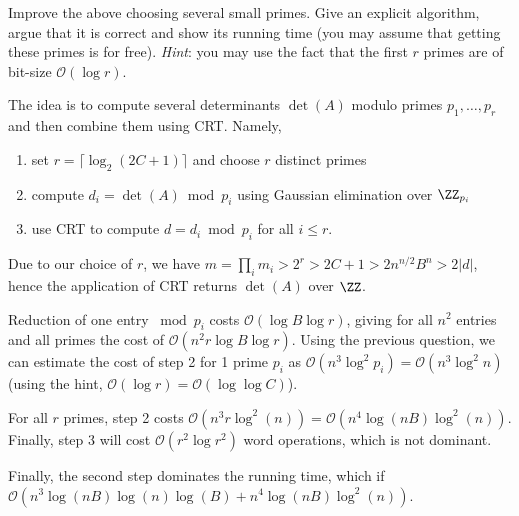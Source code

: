 \documentclass[11pt]{exam}
\theoremstyle{definition}
\begin{document}
\begin{questions}
	\question Improve the above choosing several small primes. Give an explicit algorithm, argue that it is correct and show its running time (you may assume that getting these primes is for free). \emph{Hint}: you may use the fact that the first $r$ primes are of bit-size $\mathcal{O}(\log r)$.
	\begin{solution}
		The idea is to compute several determinants $\det(A)$ modulo primes $p_1, \ldots, p_r$ and then combine them using CRT. Namely,
		\begin{enumerate}
			\item set $r = \lceil \log_2(2C+1) \rceil$ and choose $r$ distinct primes
			\item compute $d_i = \det(A) \bmod p_i$ using Gaussian elimination over $\ZZ_{p_i}$
			\item use CRT to compute $d = d_i \bmod p_i$ for all $i \leq r$.
		\end{enumerate}
		 
		 Due to our choice of $r$, we have $m = \prod_i m_i > 2^r > 2C+1 > 2 n^{n/2}B^n > 2|d|$, hence the application of CRT returns $\det(A)$ over $\ZZ$.
		 
		 
		 Reduction of one entry $\bmod p_i$ costs $\mathcal{O}(\log B \log r)$, giving for all $n^2$ entries and all primes the cost of $\mathcal{O}(n^2 r \log B \log r)$.
		 Using the previous question, we can estimate the cost of step 2 for 1 prime $p_i$ as $\mathcal{O}(n^3 \log^2 p_i)=  \mathcal{O}(n^3 \log^2 n)$ (using the hint, $\mathcal{O}(\log r) = \mathcal{O}(\log \log C)$). 
		 
		 
		 For all $r$ primes, step 2 costs $\mathcal{O}(n^3 r \log^2 (n)) = \mathcal{O}(n^4 \log(nB) \log^2(n))$. Finally, step 3 will cost $\mathcal{O}(r^2 \log r^2)$ word operations, which is not dominant.
		 
		 Finally, the second step dominates the running time, which if $\mathcal{O}(n^3\log(nB)\log(n)\log(B) + n^4 \log(nB) \log^2(n))$.
	\end{solution}
\end{questions}

%
%	
\end{document}
